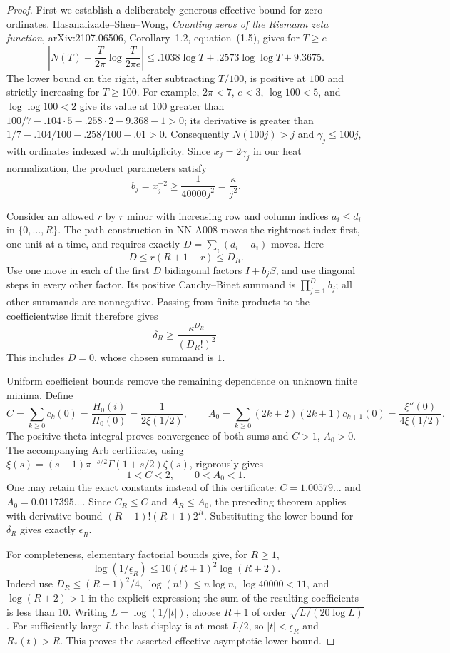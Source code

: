\begin{proof}
First we establish a deliberately generous effective bound for zero
ordinates. Hasanalizade--Shen--Wong, \emph{Counting zeros of the Riemann
zeta function}, arXiv:2107.06506, Corollary~1.2, equation~(1.5), gives
for $T\ge e$
\[
 \left|N(T)-\frac{T}{2\pi}\log\frac{T}{2\pi e}\right|
 \le .1038\log T+.2573\log\log T+9.3675.
\]
The lower bound on the right, after subtracting $T/100$, is positive
at $100$ and strictly increasing for $T\ge100$. For example,
$2\pi<7$, $e<3$, $\log100<5$, and $\log\log100<2$ give its value
at $100$ greater than
$100/7-.104\cdot5-.258\cdot2-9.368-1>0$; its derivative is greater
than $1/7-.104/100-.258/100-.01>0$.
Consequently $N(100j)>j$ and $\gamma_j\le100j$, with ordinates
indexed with multiplicity. Since $x_j=2\gamma_j$ in our heat
normalization, the product parameters satisfy
\[
 b_j=x_j^{-2}\ge\frac{1}{40000j^2}=\frac{\kappa}{j^2}.
\]

Consider an allowed $r$ by $r$ minor with increasing row and column
indices $a_i\le d_i$ in $\{0,\ldots,R\}$. The path construction in
NN-A008 moves the rightmost index first, one unit at a time, and
requires exactly $D=\sum_i(d_i-a_i)$ moves. Here
\[
 D\le r(R+1-r)\le D_R.
\]
Use one move in each of the first $D$ bidiagonal factors
$I+b_jS$, and use diagonal steps in every other factor. Its positive
Cauchy--Binet summand is $\prod_{j=1}^D b_j$; all other summands are
nonnegative. Passing from finite products to the coefficientwise
limit therefore gives
\[
 \delta_R\ge\frac{\kappa^{D_R}}{(D_R!)^2}.
\]
This includes $D=0$, whose chosen summand is $1$.

Uniform coefficient bounds remove the remaining dependence on
unknown finite minima. Define
\[
 C=\sum_{k\ge0}c_k(0)
   =\frac{H_0(i)}{H_0(0)}=\frac{1}{2\xi(1/2)},
 \qquad
 A_0=\sum_{k\ge0}(2k+2)(2k+1)c_{k+1}(0)
   =\frac{\xi''(0)}{4\xi(1/2)}.
\]
The positive theta integral proves convergence of both sums and
$C>1$, $A_0>0$. The accompanying Arb certificate, using
$\xi(s)=(s-1)\pi^{-s/2}\Gamma(1+s/2)\zeta(s)$, rigorously gives
\[
 1<C<2,\qquad 0<A_0<1.
\]
One may retain the exact constants instead of this certificate:
$C=1.00579\ldots$ and $A_0=0.0117395\ldots$.
Since $C_R\le C$ and $A_R\le A_0$, the preceding theorem applies
with derivative bound
$(R+1)!(R+1)2^R$. Substituting the lower bound for $\delta_R$
gives exactly $\underline\epsilon_R$.

For completeness, elementary factorial bounds give, for $R\ge1$,
\[
 \log(1/\underline\epsilon_R)
 \le 10(R+1)^2\log(R+2).
\]
Indeed use $D_R\le(R+1)^2/4$, $\log(n!)\le n\log n$,
$\log40000<11$, and $\log(R+2)>1$ in the explicit expression;
the sum of the resulting coefficients is less than $10$.
Writing $L=\log(1/|t|)$, choose $R+1$ of order
$\sqrt{L/(20\log L)}$. For sufficiently large $L$ the last display
is at most $L/2$, so $|t|<\underline\epsilon_R$ and $R_*(t)>R$.
This proves the asserted effective asymptotic lower bound.
\end{proof}

